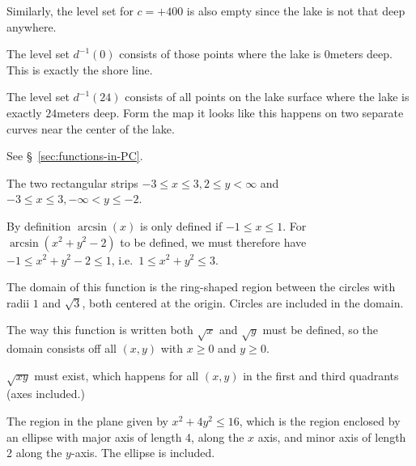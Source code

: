 Similarly, the level set for $c=+400$ is also empty since the lake is not that
deep anywhere.

The level set $d^{-1}(0)$ consists of those points where the lake is $0$meters
deep.  This is exactly the shore line.

The level set $d^{-1}(24)$ consists of all points on the lake surface where the
lake is exactly $24$meters deep.  Form the map it looks like this happens on two
separate curves near the center of the lake.
\bigskip

\item[{\bfseries(III5.10)}]

See \S~\ref{sec:functions-in-PC}.
\bigskip

\item[{\bfseries(III5.11a)}]

The two rectangular strips $-3\leq x\leq3, 2\leq y<\infty$ and
$-3\leq x\leq3, -\infty<y\leq-2$.
\bigskip

\item[{\bfseries(III5.11b)}]

By definition $\arcsin(x)$ is only defined if $-1\leq x\leq1$.
For $\arcsin(x^2+y^2-2)$ to be defined, we must therefore have
$-1\leq x^2+y^2-2 \leq 1$, i.e.\ $1\leq x^2+y^2 \leq 3$.

The domain of this function is
the ring-shaped region between the circles with radii $1$ and
$\sqrt{3}$, both centered at the origin.
Circles are included in the domain.
\bigskip

\item[{\bfseries(III5.11c)}]

The way this function is written both $\sqrt x$ and $\sqrt y$ must be defined,
so the domain consists off all $(x,y)$ with $x\geq0$ and $y\geq0$.
\bigskip

\item[{\bfseries(III5.11d)}]

$\sqrt{xy}$ must exist, which happens for all $(x,y)$ in the first
and third quadrants (axes included.)
\bigskip

\item[{\bfseries(III5.11f)}]

The region in the plane given by $x^2+4y^2\leq16$, which is the region
enclosed by an ellipse with
major axis of length 4, along the $x$ axis, and minor axis of length
2 along the $y$-axis.  The ellipse is included.
\bigskip

\item[{\bfseries(III5.12)}]

